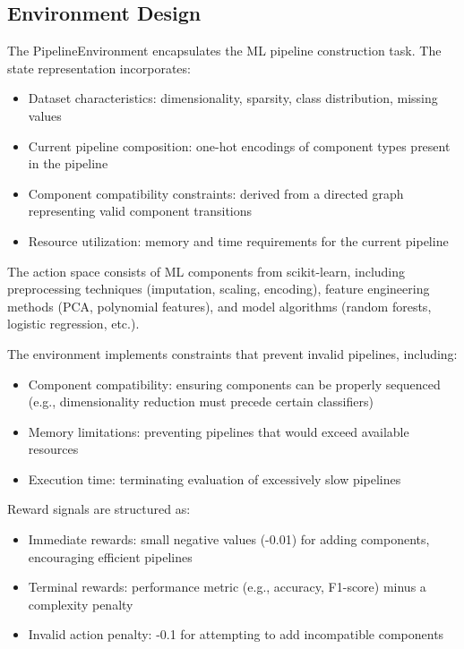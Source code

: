 \documentclass[twoside,11pt]{article}
\begin{document}
\subsection{Environment Design}

The PipelineEnvironment encapsulates the ML pipeline construction task. The state representation incorporates:

\begin{itemize}
    \item Dataset characteristics: dimensionality, sparsity, class distribution, missing values
    \item Current pipeline composition: one-hot encodings of component types present in the pipeline
    \item Component compatibility constraints: derived from a directed graph representing valid component transitions
    \item Resource utilization: memory and time requirements for the current pipeline
\end{itemize}

The action space consists of ML components from scikit-learn, including preprocessing techniques (imputation, scaling, encoding), feature engineering methods (PCA, polynomial features), and model algorithms (random forests, logistic regression, etc.).

The environment implements constraints that prevent invalid pipelines, including:
\begin{itemize}
    \item Component compatibility: ensuring components can be properly sequenced (e.g., dimensionality reduction must precede certain classifiers)
    \item Memory limitations: preventing pipelines that would exceed available resources
    \item Execution time: terminating evaluation of excessively slow pipelines
\end{itemize}

Reward signals are structured as:
\begin{itemize}
    \item Immediate rewards: small negative values (-0.01) for adding components, encouraging efficient pipelines
    \item Terminal rewards: performance metric (e.g., accuracy, F1-score) minus a complexity penalty
    \item Invalid action penalty: -0.1 for attempting to add incompatible components
\end{itemize}
\end{document}
